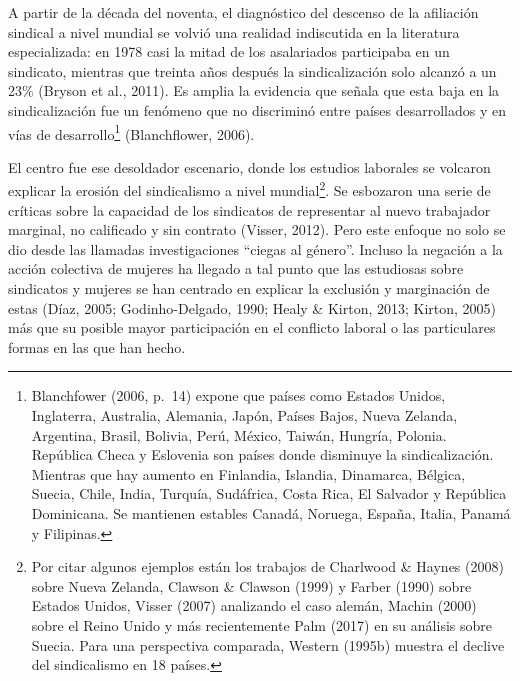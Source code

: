 \documentclass[
]{book}
\begin{document}
A partir de la década del noventa, el diagnóstico del descenso de la afiliación sindical a nivel mundial se volvió una realidad indiscutida en la literatura especializada: en 1978 casi la mitad de los asalariados participaba en un sindicato, mientras que treinta años después la sindicalización solo alcanzó a un 23\% (Bryson et al., 2011). Es amplia la evidencia que señala que esta baja en la sindicalización fue un fenómeno que no discriminó entre países desarrollados y en vías de desarrollo\footnote{Blanchfower (2006, p.~14) expone que países como Estados Unidos, Inglaterra, Australia, Alemania, Japón, Países Bajos, Nueva Zelanda, Argentina, Brasil, Bolivia, Perú, México, Taiwán, Hungría, Polonia. República Checa y Eslovenia son países donde disminuye la sindicalización. Mientras que hay aumento en Finlandia, Islandia, Dinamarca, Bélgica, Suecia, Chile, India, Turquía, Sudáfrica, Costa Rica, El Salvador y República Dominicana. Se mantienen estables Canadá, Noruega, España, Italia, Panamá y Filipinas.} (Blanchflower, 2006).

El centro fue ese desoldador escenario, donde los estudios laborales se volcaron explicar la erosión del sindicalismo a nivel mundial\footnote{Por citar algunos ejemplos están los trabajos de Charlwood \& Haynes (2008) sobre Nueva Zelanda, Clawson \& Clawson (1999) y Farber (1990) sobre Estados Unidos, Visser (2007) analizando el caso alemán, Machin (2000) sobre el Reino Unido y más recientemente Palm (2017) en su análisis sobre Suecia. Para una perspectiva comparada, Western (1995b) muestra el declive del sindicalismo en 18 países.}. Se esbozaron una serie de críticas sobre la capacidad de los sindicatos de representar al nuevo trabajador marginal, no calificado y sin contrato (Visser, 2012). Pero este enfoque no solo se dio desde las llamadas investigaciones ``ciegas al género''. Incluso la negación a la acción colectiva de mujeres ha llegado a tal punto que las estudiosas sobre sindicatos y mujeres se han centrado en explicar la exclusión y marginación de estas (Díaz, 2005; Godinho-Delgado, 1990; Healy \& Kirton, 2013; Kirton, 2005) más que su posible mayor participación en el conflicto laboral o las particulares formas en las que han hecho.
\end{document}
